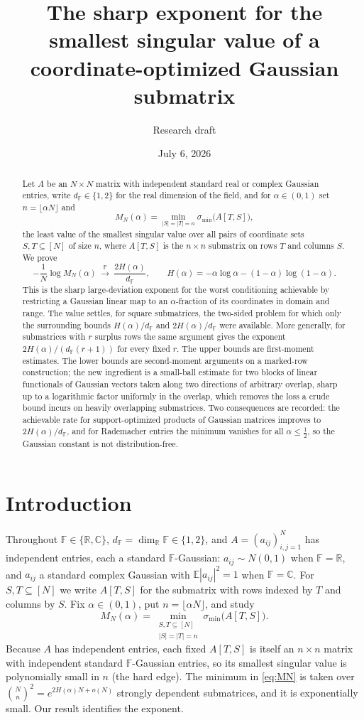 \documentclass[11pt,reqno]{amsart}
\title[The sharp exponent for coordinate-optimized least singular values]{The sharp exponent for the smallest singular value of a coordinate-optimized Gaussian submatrix}
\author{Research draft}
\date{July 6, 2026}
\theoremstyle{plain}
\theoremstyle{definition}
\theoremstyle{remark}
\newcommand{\R}{\mathbb{R}}
\newcommand{\C}{\mathbb{C}}
\newcommand{\F}{\mathbb{F}}
\newcommand{\PP}{\mathbb{P}}
\newcommand{\EE}{\mathbb{E}}
\newcommand{\smin}{\sigma_{\min}}
\newcommand{\dF}{d_{\F}}
\begin{document}
\begin{abstract}
Let $A$ be an $N\times N$ matrix with independent standard real or complex Gaussian entries, write
$\dF\in\{1,2\}$ for the real dimension of the field, and for $\alpha\in(0,1)$ set
$n=\lfloor\alpha N\rfloor$ and
\[
  M_N(\alpha)=\min_{|S|=|T|=n}\smin\bigl(A[T,S]\bigr),
\]
the least value of the smallest singular value over all pairs of coordinate sets $S,T\subseteq[N]$
of size $n$, where $A[T,S]$ is the $n\times n$ submatrix on rows $T$ and columns $S$. We prove
\[
  -\frac1N\log M_N(\alpha)\ \xrightarrow{\ \PP\ }\ \frac{2H(\alpha)}{\dF},\qquad
  H(\alpha)=-\alpha\log\alpha-(1-\alpha)\log(1-\alpha).
\]
This is the sharp large-deviation exponent for the worst conditioning achievable by restricting a
Gaussian linear map to an $\alpha$-fraction of its coordinates in domain and range. The value settles,
for square submatrices, the two-sided problem for which only the surrounding bounds $H(\alpha)/\dF$
and $2H(\alpha)/\dF$ were available. More generally, for submatrices with $r$ surplus rows the same
argument gives the exponent $2H(\alpha)/(\dF(r+1))$ for every fixed $r$. The upper bounds are
first-moment estimates. The lower bounds are second-moment arguments on a marked-row construction;
the new ingredient is a small-ball estimate for two blocks of linear functionals of Gaussian vectors
taken along two directions of arbitrary overlap, sharp up to a logarithmic factor uniformly in the
overlap, which removes the loss a crude bound incurs on heavily overlapping submatrices. Two
consequences are recorded: the achievable rate for support-optimized products of Gaussian matrices
improves to $2H(\alpha)/\dF$, and for Rademacher entries the minimum vanishes for all
$\alpha\le\tfrac12$, so the Gaussian constant is not distribution-free.
\end{abstract}
\maketitle

\section{Introduction}\label{sec:intro}
Throughout $\F\in\{\R,\C\}$, $\dF=\dim_\R\F\in\{1,2\}$, and $A=(a_{ij})_{i,j=1}^N$ has independent
entries, each a standard $\F$-Gaussian: $a_{ij}\sim N(0,1)$ when $\F=\R$, and $a_{ij}$ a standard
complex Gaussian with $\EE|a_{ij}|^2=1$ when $\F=\C$. For $S,T\subseteq[N]$ we write $A[T,S]$ for the
submatrix with rows indexed by $T$ and columns by $S$. Fix $\alpha\in(0,1)$, put $n=\lfloor\alpha
N\rfloor$, and study
\begin{equation}\label{eq:MN}
  M_N(\alpha)=\min_{\substack{S,T\subseteq[N]\\ |S|=|T|=n}}\smin\bigl(A[T,S]\bigr).
\end{equation}
Because $A$ has independent entries, each fixed $A[T,S]$ is itself an $n\times n$ matrix with
independent standard $\F$-Gaussian entries, so its smallest singular value is polynomially small in
$n$ (the hard edge). The minimum in \eqref{eq:MN} is taken over $\binom Nn^2=e^{2H(\alpha)N+o(N)}$
strongly dependent submatrices, and it is exponentially small. Our result identifies the exponent.
\end{document}
